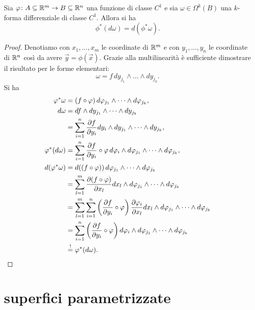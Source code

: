 \begin{theorem}
  Sia $\varphi\colon A\subseteq {\mathbb R}^m \to B\subseteq {\mathbb R}^n$ una funzione di classe $C^1$ 
  e sia $\omega\in \Omega^k(B)$ una $k$-forma differenziale di classe $C^1$.
  Allora si ha 
\begin{equation}\label{eq:pullback-differenziale}
    \phi^* (d\omega) = d(\phi^* \omega).
\end{equation}
\end{theorem}
\begin{proof}
Denotiamo con $x_1,\dots, x_m$ le coordinate di ${\mathbb R}^m$ e con $y_1,\dots, y_n$ le coordinate di ${\mathbb R}^n$
così da avere $\vec y = \phi(\vec x)$.
Grazie alla multilinearità è sufficiente dimostrare il risultato 
per le forme elementari:
\[
  \omega = f\, dy_{j_1} \wedge \dots \wedge dy_{j_k}.
\]
Si ha
\begin{align*}
  \varphi^* \omega 
    &= (f\circ \varphi)\, d\varphi_{j_1} \wedge \dots \wedge d\varphi_{j_k}, \\
  d\omega 
    &=  df \wedge dy_{j_1} \wedge \dots \wedge dy_{j_k} \\
    &= \sum_{i=1}^n \frac{\partial f}{\partial y_i} dy_i \wedge dy_{j_1} \wedge \dots \wedge dy_{j_k},\\
  \varphi^* (d\omega)
    &= \sum_{i=1}^n \frac{\partial f}{\partial y_i} \circ \varphi\, d\varphi_i \wedge d\varphi_{j_1} \wedge \dots \wedge d\varphi_{j_k},\\
  d(\varphi^* \omega)
    &= d{\left( (f\circ \varphi) \right)}\, d \varphi_{j_1} \wedge \dots \wedge d \varphi_{j_k}\\
    &= \sum_{l=1}^m \frac{\partial (f\circ \varphi)}{\partial x_l} dx_l \wedge d\varphi_{j_1} \wedge \dots \wedge d\varphi_{j_k}\\
    &= \sum_{l=1}^m \sum_{i=1}^n {\left( \frac{\partial f}{\partial y_i} \circ \varphi \right)}\, \frac{\partial \varphi_i}{\partial x_l} dx_l \wedge d\varphi_{j_1} \wedge \dots \wedge d\varphi_{j_k}\\
    &= \sum_{i=1}^n {\left( \frac{\partial f}{\partial y_i} \circ \varphi \right)}\, d\varphi_i \wedge d\varphi_{j_1} \wedge \dots \wedge d\varphi_{j_k} \\
    &\stackrel! = \varphi^* (d\omega).
\end{align*}
\end{proof}

\section{superfici parametrizzate}

